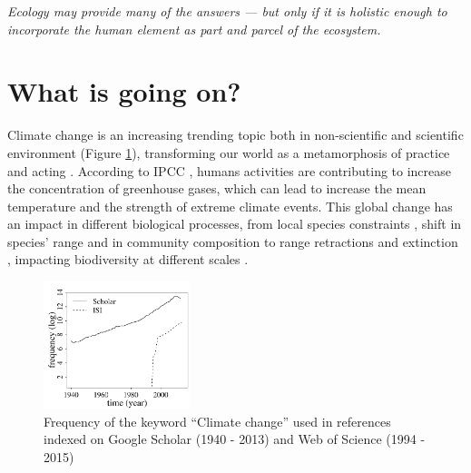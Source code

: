 


\begin{displayquote}
\centering\textit{Ecology may provide many of the answers — but only if it is holistic enough to incorporate the human element as part and parcel of the ecosystem.} \\ 
\end{displayquote}

\section{What is going on?}

Climate change is an increasing trending topic both in non-scientific \citep{Capstick2015} and scientific environment (Figure \ref{fig:fig1}), transforming our world as a metamorphosis of practice and acting \citep{Beck2016}.
According to IPCC \citep{Cubasch2013}, humans activities are contributing to increase the concentration of greenhouse gases, which can lead to increase the mean temperature and the strength of extreme climate events.
This global change has an impact in different biological processes, from local species constraints \citep[e.g. low regeneration][]{Treyger2011}, shift in species' range \citep{Boisvert-Marsh2014,Monleon2015} and in community composition \citep{Dieleman2015} to range retractions and extinction \citep{Thomas2006}, impacting biodiversity at different scales \citep{Penuelas2013}.

\begin{figure}
    \centering
    \includegraphics[width=0.38\textwidth]{img/fig1_em.pdf}
    \caption{Frequency of the keyword ``Climate change'' used in references indexed on Google Scholar (1940 - 2013) and Web of Science (1994 - 2015)}
    \label{fig:fig1}
\end{figure}

